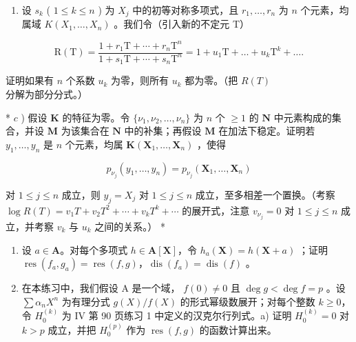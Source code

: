 \begin{enumerate}
\def\labelenumi{\alph{enumi})}
\setcounter{enumi}{1}
\tightlist
\item
  设 \(s_k\) ( \(1 \leqslant k \leqslant n\) ) 为 \(X_j\) 中的初等对称多项式，且 \(r_1, \ldots, r_n\) 为 \(n\) 个元素，均属域 \(K(X_1, \ldots, X_n)\) 。我们令（引入新的不定元 T）
\end{enumerate}

\[
\mathrm{R} (\mathrm{T}) = \frac {1 + r _ {1} \mathrm{T} + \cdots + r _ {n} \mathrm{T} ^ {n}}{1 + s _ {1} \mathrm{T} + \cdots + s _ {n} \mathrm{T} ^ {n}} = 1 + u _ {1} \mathrm{T} + \dots + u _ {k} \mathrm{T} ^ {k} + \dots .
\]

证明如果有 \(n\) 个系数 \(u_{k}\) 为零，则所有 \(u_{k}\) 都为零。（把 \(R(T)\) 分解为部分分式。）

* \(c\) ) 假设 \(\mathbf{K}\) 的特征为零。令 \(\{\nu_1,\nu_2,\dots,\nu_n\}\) 为 \(n\) 个 \(\geqslant 1\) 的 \(\mathbf{N}\) 中元素构成的集合，并设 \(\mathbf{M}\) 为该集合在 \(\mathbf{N}\) 中的补集；再假设 \(\mathbf{M}\) 在加法下稳定。证明若 \(y_{1},\ldots ,y_{n}\) 是 \(n\) 个元素，均属 \(\mathbf{K}(\mathbf{X}_1,\dots,\mathbf{X}_n)\) ，使得

\[
p _ {\nu _ {j}} (y _ {1}, \dots , y _ {n}) = p _ {\nu _ {j}} (\mathbf {X} _ {1}, \dots , \mathbf {X} _ {n})
\]

对 \(1 \leqslant j \leqslant n\) 成立，则 \(y_{j} = X_{j}\) 对 \(1 \leqslant j \leqslant n\) 成立，至多相差一个置换。（考察 \(\log R(T) = v_{1}T + v_{2}T^{2} + \cdots + v_{k}T^{k} + \cdots\) 的展开式，注意 \(v_{\nu_{j}} = 0\) 对 \(1 \leqslant j \leqslant n\) 成立，并考察 \(v_{k}\) 与 \(u_{k}\) 之间的关系。） *

\begin{enumerate}
\def\labelenumi{\arabic{enumi})}
\setcounter{enumi}{9}
\item
  设 \(a \in \mathbf{A}\)。对每个多项式 \(h \in \mathbf{A}[\mathbf{X}]\)，令 \(h_a(\mathbf{X}) = h(\mathbf{X} + a)\) ；证明 \(\operatorname{res}(f_a, g_a) = \operatorname{res}(f, g)\)，\(\operatorname{dis}(f_a) = \operatorname{dis}(f)\) 。
\item
  在本练习中，我们假设 A 是一个域， \(f(0) \neq 0\) 且 \(\deg g < \deg f = p\) 。设 \(\sum \alpha_{n} X^{n}\) 为有理分式 \(g(X) / f(X)\) 的形式幂级数展开；对每个整数 \(k \geqslant 0\)，令 \(H_{0}^{(k)}\) 为 IV 第 90 页练习 1 中定义的汉克尔行列式。a) 证明 \(H_{0}^{(k)} = 0\) 对 \(k > p\) 成立，并把 \(H_{0}^{(p)}\) 作为 \(\operatorname{res}(f, g)\) 的函数计算出来。
\end{enumerate}


